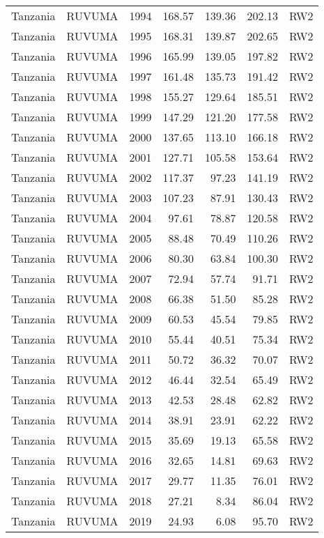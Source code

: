 \begin{longtable}{lllrrrl}
  Tanzania & RUVUMA & 1994 & 168.57 & 139.36 & 202.13 & RW2 \\ 
  Tanzania & RUVUMA & 1995 & 168.31 & 139.87 & 202.65 & RW2 \\ 
  Tanzania & RUVUMA & 1996 & 165.99 & 139.05 & 197.82 & RW2 \\ 
  Tanzania & RUVUMA & 1997 & 161.48 & 135.73 & 191.42 & RW2 \\ 
  Tanzania & RUVUMA & 1998 & 155.27 & 129.64 & 185.51 & RW2 \\ 
  Tanzania & RUVUMA & 1999 & 147.29 & 121.20 & 177.58 & RW2 \\ 
  Tanzania & RUVUMA & 2000 & 137.65 & 113.10 & 166.18 & RW2 \\ 
  Tanzania & RUVUMA & 2001 & 127.71 & 105.58 & 153.64 & RW2 \\ 
  Tanzania & RUVUMA & 2002 & 117.37 & 97.23 & 141.19 & RW2 \\ 
  Tanzania & RUVUMA & 2003 & 107.23 & 87.91 & 130.43 & RW2 \\ 
  Tanzania & RUVUMA & 2004 & 97.61 & 78.87 & 120.58 & RW2 \\ 
  Tanzania & RUVUMA & 2005 & 88.48 & 70.49 & 110.26 & RW2 \\ 
  Tanzania & RUVUMA & 2006 & 80.30 & 63.84 & 100.30 & RW2 \\ 
  Tanzania & RUVUMA & 2007 & 72.94 & 57.74 & 91.71 & RW2 \\ 
  Tanzania & RUVUMA & 2008 & 66.38 & 51.50 & 85.28 & RW2 \\ 
  Tanzania & RUVUMA & 2009 & 60.53 & 45.54 & 79.85 & RW2 \\ 
  Tanzania & RUVUMA & 2010 & 55.44 & 40.51 & 75.34 & RW2 \\ 
  Tanzania & RUVUMA & 2011 & 50.72 & 36.32 & 70.07 & RW2 \\ 
  Tanzania & RUVUMA & 2012 & 46.44 & 32.54 & 65.49 & RW2 \\ 
  Tanzania & RUVUMA & 2013 & 42.53 & 28.48 & 62.82 & RW2 \\ 
  Tanzania & RUVUMA & 2014 & 38.91 & 23.91 & 62.22 & RW2 \\ 
  Tanzania & RUVUMA & 2015 & 35.69 & 19.13 & 65.58 & RW2 \\ 
  Tanzania & RUVUMA & 2016 & 32.65 & 14.81 & 69.63 & RW2 \\ 
  Tanzania & RUVUMA & 2017 & 29.77 & 11.35 & 76.01 & RW2 \\ 
  Tanzania & RUVUMA & 2018 & 27.21 & 8.34 & 86.04 & RW2 \\ 
  Tanzania & RUVUMA & 2019 & 24.93 & 6.08 & 95.70 & RW2 \\ 

\end{longtable}
